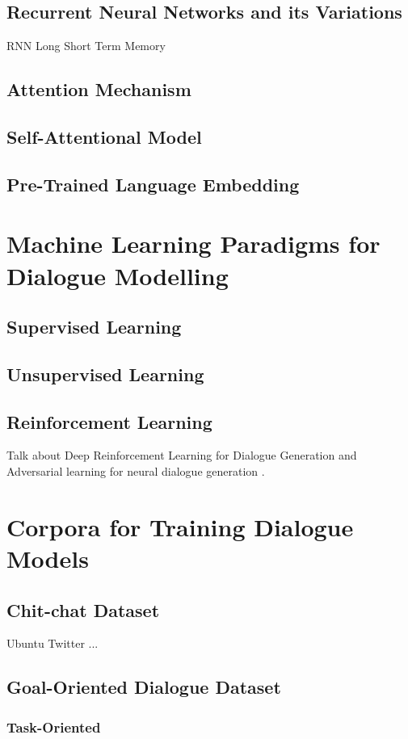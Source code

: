 \documentclass[bsc,frontabs,twoside,singlespacing,parskip,deptreport]{infthesis}     %
\begin{document}
\subsection{Recurrent Neural Networks and its Variations}
RNN
Long Short Term Memory
\subsection{Attention Mechanism}
\subsection{Self-Attentional Model}
\subsection{Pre-Trained Language Embedding}

\section{Machine Learning Paradigms for Dialogue Modelling}
\subsection{Supervised Learning}
\subsection{Unsupervised Learning}
\subsection{Reinforcement Learning}
Talk about Deep Reinforcement Learning for Dialogue Generation\cite{li2016deep} and Adversarial learning for neural dialogue generation \cite{li2017adversarial}.


\section{Corpora for Training Dialogue Models}
\subsection{Chit-chat Dataset}
Ubuntu
Twitter
...
\subsection{Goal-Oriented Dialogue Dataset}
\subsubsection*{Task-Oriented}
\end{document}
